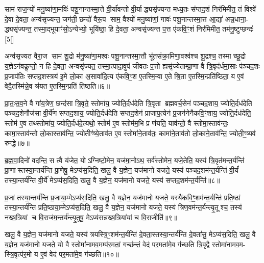 साम॑ राज॒न्यो॑ मनु॒ष्या॑णा॒मविः॑ पशू॒नान्तस्मा॒त्ते वी॒र्या॑वन्तो वी॒र्याद्ध्यसृ॑ज्यन्त मध्य॒तः स॑प्तद॒शं निर॑मिमीत॒ तं विश्वे॑ दे॒वा दे॒वता॒ अन्व॑सृज्यन्त॒ जग॑ती॒ छन्दो॑ वैरू॒प साम॒ वैश्यो॑ मनु॒ष्या॑णां॒ गावः॑ पशू॒नान्तस्मा॒त्त आ॒द्या॑ अन्न॒धाना॒- द्ध्यसृ॑ज्यन्त॒ तस्मा॒द्भूयाꣳ॑सो॒ऽन्येभ्यो॒ भूयि॑ष्ठा॒ हि दे॒वता॒ अन्वसृ॑ज्यन्त प॒त्त ए॑कवि॒ꣳ॒शं निर॑मिमीत॒ तम॑नु॒ष्टुप्छन्दः॑ [5[]

अन्व॑सृज्यत वैरा॒ज साम॑ शू॒द्रो म॑नु॒ष्या॑णा॒मश्वः॑ पशू॒नान्तस्मा॒त्तौ भू॑तसंक्रा॒मिणा॒वश्व॑श्च शू॒द्रश्च॒ तस्माच्छू॒द्रो य॒ज्ञेऽन॑वकॢप्तो॒ न हि दे॒वता॒ अन्वसृ॑ज्यत॒ तस्मा॒त्पादा॒वुप॑ जीवतः प॒त्तो ह्यसृ॑ज्येताम्प्रा॒णा वै त्रि॒वृद॑र्धमा॒साः प॑ञ्चद॒शः प्र॒जाप॑तिः सप्तद॒शस्त्रय॑ इ॒मे लो॒का अ॒सावा॑दि॒त्य ए॑कवि॒ꣳ॒श ए॒तस्मि॒न्वा ए॒ते श्रि॒ता ए॒तस्मि॒न्प्रति॑ष्ठिता॒ य ए॒वं वेदै॒तस्मि॑न्ने॒व श्र॑यत ए॒तस्मि॒न्प्रति॑ तिष्ठति॥६॥

{\anuvakamend[{अस्थू॑रि॒रोष॑धीषु ज्येष्ठय॒ज्ञ इति॑ बृ॒हद॑नु॒ष्टुप्छन्दः॒ प्रति॑ष्ठिता॒ नव॑ च॥१॥}]}

प्रा॒तः॒स॒व॒ने वै गा॑य॒त्रेण॒ छन्द॑सा त्रि॒वृते॒ स्तोमा॑य॒ ज्योति॒र्दध॑देति त्रि॒वृता ब्रह्मवर्च॒सेन॑ पञ्चद॒शाय॒ ज्योति॒र्दध॑देति पञ्चद॒शेनौज॑सा वी॒र्ये॑ण सप्तद॒शाय॒ ज्योति॒र्दध॑देति सप्तद॒शेन॑ प्राजाप॒त्येन॑ प्र॒जन॑नेनैकवि॒ꣳ॒शाय॒ ज्योति॒र्दध॑देति॒ स्तोम॑ ए॒व तथ्स्तोमा॑य॒ ज्योति॒र्दध॑दे॒त्यथो॒ स्तोम॑ ए॒व स्तोम॑म॒भि प्र ण॑यति॒ याव॑न्तो॒ वै स्तोमा॒स्ताव॑न्तः॒ कामा॒स्ताव॑न्तो लो॒कास्ताव॑न्ति॒ ज्योतीꣳ॑ष्ये॒ताव॑त ए॒व स्तोमा॑ने॒ताव॑तः॒ कामा॑ने॒ताव॑तो लो॒काने॒ताव॑न्ति॒ ज्योती॒ꣳ॒ष्यव॑ रुन्द्धे॥७॥

{\anuvakamend[{ताव॑न्तो लो॒कास्त्रयो॑दश च॥२॥}]}

ब्र॒ह्म॒वा॒दिनो॑ वदन्ति॒ स त्वै य॑जेत॒ योऽग्निष्टो॒मेन॒ यज॑मा॒नोऽथ॒ सर्व॑स्तोमेन॒ यजे॒तेति॒ यस्य॑ त्रि॒वृत॑मन्त॒र्यन्ति॑ प्रा॒णास्तस्या॒न्तर्य॑न्ति प्रा॒णेषु॒ मेऽप्य॑स॒दिति॒ खलु॒ वै य॒ज्ञेन॒ यज॑मानो यजते॒ यस्य॑ पञ्चद॒शम॑न्त॒र्यन्ति॑ वी॒र्यं॑ तस्या॒न्तर्य॑न्ति वी॒र्ये॑ मेऽप्य॑स॒दिति॒ खलु॒ वै य॒ज्ञेन॒ यज॑मानो यजते॒ यस्य॑ सप्तद॒शम॑न्त॒र्यन्ति॑॥८॥

प्र॒जां तस्या॒न्तर्य॑न्ति प्र॒जाया॒म्मेऽप्य॑स॒दिति॒ खलु॒ वै य॒ज्ञेन॒ यज॑मानो यजते॒ यस्यै॑कवि॒ꣳ॒शम॑न्त॒र्यन्ति॑ प्रति॒ष्ठां तस्या॒न्तर्य॑न्ति प्रति॒ष्ठाया॒म्मेऽप्य॑स॒दिति॒ खलु॒ वै य॒ज्ञेन॒ यज॑मानो यजते॒ यस्य॑ त्रिण॒वम॑न्त॒र्यन्त्यृ॒तूश्च॒ तस्य॑ नख्ष॒त्रियां च वि॒राज॑म॒न्तर्य॑न्त्यृ॒तुषु॒ मेऽप्य॑सन्नख्ष॒त्रिया॑यां च वि॒राजीति॑॥९॥

खलु॒ वै य॒ज्ञेन॒ यज॑मानो यजते॒ यस्य॑ त्रयस्त्रि॒ꣳ॒शम॑न्त॒र्यन्ति॑ दे॒वता॒स्तस्या॒न्तर्य॑न्ति दे॒वता॑सु॒ मेऽप्य॑स॒दिति॒ खलु॒ वै य॒ज्ञेन॒ यज॑मानो यजते॒ यो वै स्तोमा॑नामव॒मम्प॑र॒मतां॒ गच्छ॑न्तं॒ वेद॑ पर॒मता॑मे॒व ग॑च्छति त्रि॒वृद्वै स्तोमा॑नामव॒म- स्त्रि॒वृत्प॑र॒मो य ए॒वं वेद॑ पर॒मता॑मे॒व ग॑च्छति॥१०॥

